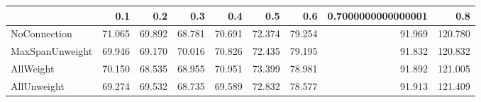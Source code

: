\begin{tabular}{lrrrrrrrr}
\toprule
{} &    0.1 &    0.2 &    0.3 &    0.4 &    0.5 &    0.6 & 0.7000000000000001 &     0.8 \\
\midrule
NoConnection    & 71.065 & 69.892 & 68.781 & 70.691 & 72.374 & 79.254 &             91.969 & 120.780 \\
MaxSpanUnweight & 69.946 & 69.170 & 70.016 & 70.826 & 72.435 & 79.195 &             91.832 & 120.832 \\
AllWeight       & 70.150 & 68.535 & 68.955 & 70.951 & 73.399 & 78.981 &             91.892 & 121.005 \\
AllUnweight     & 69.274 & 69.532 & 68.735 & 69.589 & 72.832 & 78.577 &             91.913 & 121.409 \\
\bottomrule
\end{tabular}
